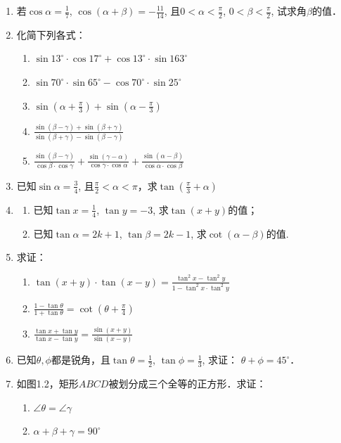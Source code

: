 \begin{enumerate}
\item 若$\cos\alpha=\frac{1}{7}$, $\cos(\alpha+\beta)=-\frac{11}{14}$, 且$0<\alpha<\frac{\pi}{2}$, $0<\beta<\frac{\pi}{2}$, 试求角$\beta$的值．

\item 化简下列各式：
\begin{enumerate}
    \item $\sin13^{\circ}\cdot\cos17^{\circ}+\cos13^{\circ}\cdot \sin163^{\circ}$
    \item $\sin70^{\circ}\cdot\sin65^{\circ}-\cos70^{\circ}\cdot\sin25^{\circ}$
    \item $\sin\left(\alpha+\frac{\pi}{3}\right)+\sin\left(\alpha-\frac{\pi}{3}\right)$
    \item $\frac{\sin(\beta-\gamma)+\sin(\beta+\gamma)}{\sin(\beta+\gamma)-\sin(\beta-\gamma)}$
    \item $\frac{\sin(\beta-\gamma)}{\cos\beta\cdot \cos\gamma}+\frac{\sin(\gamma-\alpha)}{\cos\gamma\cdot \cos\alpha}+\frac{\sin(\alpha-\beta)}{\cos\alpha\cdot \cos\beta}$
\end{enumerate}

\item 已知$\sin\alpha=\frac{3}{4}$, 且$\frac{\pi}{2}<\alpha<\pi$，求$\tan\left(\frac{\pi}{3}+\alpha\right)$
\item \begin{enumerate}
    \item 已知$\tan x=\frac{1}{4}$, $\tan y=-3$, 求$\tan(x+y)$的值；
    \item 已知$\tan \alpha=2k+1$, $\tan\beta=2k-1$, 求$\cot(\alpha-\beta)$的值.
\end{enumerate}

\item 求证：
\begin{enumerate}
    \item $\tan(x+y)\cdot \tan(x-y)=\frac{\tan^2 x-\tan^2 y}{1-\tan^2 x\cdot \tan^2 y}$
    \item $\frac{1-\tan\theta}{1+\tan\theta}=\cot\left(\theta+\frac{\pi}{4}\right)$
\item $\frac{\tan x+\tan y}{\tan x-\tan y}=\frac{\sin(x+y)}{\sin(x-y)}$
\end{enumerate}

\item 已知$\theta, \phi$都是锐角，且$\tan \theta=\frac{1}{2}$, $\tan\phi=\frac{1}{3}$, 求证：
$\theta+\phi=45^{\circ}$．

\item 如图1.2，矩形$ABCD$被划分成三个全等的正方形．求证：
\begin{enumerate}
    \item $\angle \theta=\angle \gamma$
    \item $\alpha+\beta+\gamma=90^{\circ}$
\end{enumerate}


\end{enumerate}
